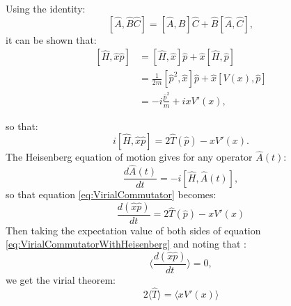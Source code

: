 \documentclass[12pt]{article}
\begin{document}
        Using the identity:
        \begin{equation}
            \label{eq:CommutatorABC}
            \left[\hat{A},\hat{B}\hat{C}\right] = \left[\hat{A},\hat{B}\right]\hat{C}+\hat{B}\left[\hat{A},\hat{C}\right],
        \end{equation}
        it can be shown that:
        \begin{align}
            \label{eq:VirialHCommutator1} \left[\hat{H},\hat{x}\hat{p}\right] & = \left[\hat{H},\hat{x}\right]\hat{p} + \hat{x}\left[\hat{H},\hat{p}\right] \\
            \label{eq:VirialHCommutator2} & = \frac{1}{2m}\left[\hat{p}^2,\hat{x}\right]\hat{p}+\hat{x}\left[V\left(x\right),\hat{p}\right] \\
            \label{eq:VirialHCommutator2} & = -i\frac{\hat{p}^2}{m} + ixV'\left(x\right),
        \end{align}

        so that:
        \begin{equation}
            \label{eq:VirialCommutator}
            i\left[\hat{H},\hat{x}\hat{p}\right] = 2\hat{T}\left(\hat{p}\right)-xV'\left(x\right).
        \end{equation}
        The Heisenberg equation of motion gives for any operator $\hat{A}\left(t\right)$:
        \begin{equation}
            \label{eq:HeisenbergEquationOfMotion}
            \frac{d\hat{A}\left(t\right)}{dt} = -i\left[\hat{H},\hat{A}\left(t\right)\right],
        \end{equation}
        so that equation \ref{eq:VirialCommutator} becomes:
        \begin{equation}
            \label{eq:VirialCommutatorWithHeisenberg}
            \frac{d\left(\hat{x}\hat{p}\right)}{dt} = 2\hat{T}\left(\hat{p}\right)-xV'\left(x\right)
        \end{equation}
        Then taking the expectation value of both sides of equation \ref{eq:VirialCommutatorWithHeisenberg} and noting that :
        \begin{equation}
            \label{eq:VanishingExpectationOfTimeDerivative}
            \langle \frac{d\left(\hat{x}\hat{p}\right)}{dt} \rangle = 0,
        \end{equation}
        we get the virial theorem:
        \begin{equation}
            \label{eq:VirialTheoremAppendix}
            2\langle\hat{T}\rangle = \langle xV'\left(x\right)\rangle
        \end{equation}
\end{document}
